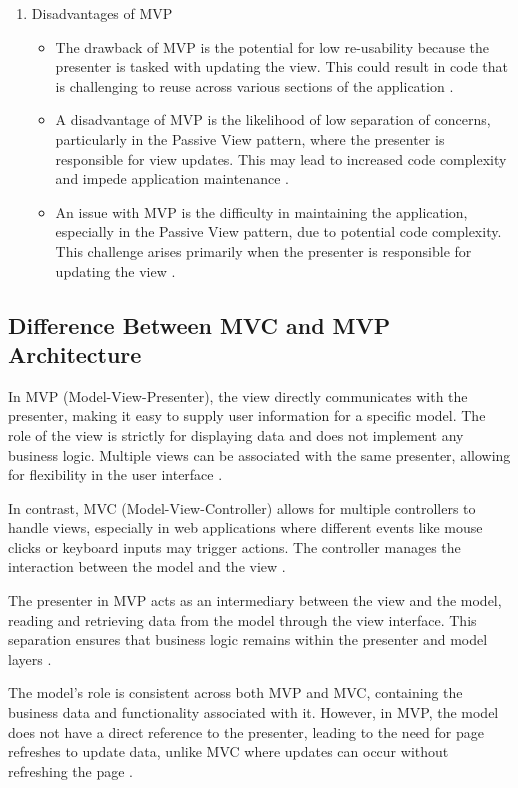 \documentclass[conference]{IEEEtran}
\begin{document}
\begin{enumerate}
\begin{itemize}
\end{itemize}
\item Disadvantages of MVP
\begin{itemize}
\item The drawback of MVP is the potential for low re-usability because the presenter is tasked with updating the view. This could result in code that is challenging to reuse across various sections of the application \cite{Lappalainen2017APL}.
\item A disadvantage of MVP is the likelihood of low separation of concerns, particularly in the Passive View pattern, where the presenter is responsible for view updates. This may lead to increased code complexity and impede application maintenance \cite{Lappalainen2017APL}.
\item An issue with MVP is the difficulty in maintaining the application, especially in the Passive View pattern, due to potential code complexity. This challenge arises primarily when the presenter is responsible for updating the view \cite{Lappalainen2017APL}.
\end{itemize}
\end{enumerate}

\subsection{Difference Between MVC and MVP Architecture}
In MVP (Model-View-Presenter), the view directly communicates with the presenter, making it easy to supply user information for a specific model. The role of the view is strictly for displaying data and does not implement any business logic. Multiple views can be associated with the same presenter, allowing for flexibility in the user interface \cite{c2}.

In contrast, MVC (Model-View-Controller) allows for multiple controllers to handle views, especially in web applications where different events like mouse clicks or keyboard inputs may trigger actions. The controller manages the interaction between the model and the view \cite{c2}.

The presenter in MVP acts as an intermediary between the view and the model, reading and retrieving data from the model through the view interface. This separation ensures that business logic remains within the presenter and model layers \cite{c2}.

The model's role is consistent across both MVP and MVC, containing the business data and functionality associated with it. However, in MVP, the model does not have a direct reference to the presenter, leading to the need for page refreshes to update data, unlike MVC where updates can occur without refreshing the page \cite{c2}.
\end{document}
